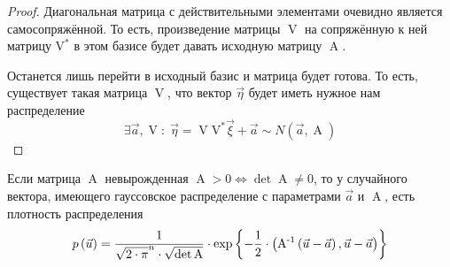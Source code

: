 \begin{proof}
    Диагональная матрица с действительными элементами очевидно является
    самосопряжённой. То есть, произведение матрицы $\operatorname{V}$ на
    сопряжённую к ней матрицу $\operatorname{V^*}$ в этом базисе будет давать
    исходную матрицу $\operatorname{A}$.

    Останется лишь перейти в исходный базис и матрица будет готова. То есть,
    существует такая матрица $\operatorname{V}$, что вектор $\vec{\eta}$ будет
    иметь нужное нам распределение
    $$\exists \vec{a}, \operatorname{V}:\;
        \vec{\eta} = \operatorname{V} \operatorname{V^*} \vec{\xi} + \vec{a}
        \sim N\left( \vec{a}, \operatorname{A} \right)$$
\end{proof}

\begin{theorem}
    Если матрица $\operatorname{A}$ невырожденная
    $\operatorname{A} > 0 \Leftrightarrow \det{\operatorname{A}} \neq 0$,
    то у случайного вектора, имеющего гауссовское распределение с параметрами
    $\vec{a}$ и $\operatorname{A}$, есть плотность распределения
    $$p\left(\vec{u}\right)
        = \frac{1}{\sqrt{2 \cdot \pi}^n \cdot \sqrt{\det{\operatorname{A}}}}
            \cdot \exp{\left\{ -\frac{1}{2} \cdot \left(
                \operatorname{A^{-1}} \left( \vec{u} - \vec{a} \right),
                \vec{u} - \vec{a} \right) \right\}}$$
\end{theorem}
